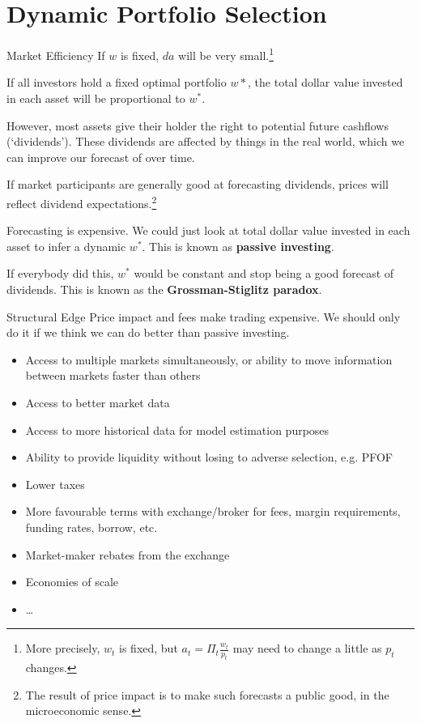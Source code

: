 \documentclass{beamer}
\newcommand{\sectionquote}[1]{\def\insertsquote{#1}}
\newcommand{\insertsquote}{}
\renewcommand{\insertsquote}{}
\begin{document}
\sectionquote{``Values which do not `yet' exist, except as probabilistic estimations, or risk structures, acquire a power of command over economic (and therefore social) processes, necessarily devalorizing the actual.'' Nick Land, Teleoplexy}
\section{Dynamic Portfolio Selection}
\begin{frame}{Market Efficiency}
	If $w$ is fixed, $da$ will be very small.\footnote{More precisely, $w_t$ is fixed, but $a_t=\Pi_t \frac{w_t}{p_t}$ may need to change a little as $p_t$ changes.}

	If all investors hold a fixed optimal portfolio $w*$, the total dollar value invested in each asset will be proportional to $w^*$.

	However, most assets give their holder the right to potential future cashflows (`dividends'). 
	These dividends are affected by things in the real world, which we can improve our forecast of over time.

	If market participants are generally good at forecasting dividends, prices will reflect dividend expectations.\footnote{The result of price impact is to make such forecasts a public good, in the microeconomic sense.}

	Forecasting is expensive. We could just look at total dollar value invested in each asset to infer a dynamic $w^*$. This is known as \textbf{passive investing}.

	If everybody did this, $w^*$ would be constant and stop being a good forecast of dividends. This is known as the \textbf{Grossman-Stiglitz paradox}.
\end{frame}

\begin{frame}{Structural Edge}
	Price impact and fees make trading expensive. We should only do it if we think we can do better than passive investing.

	\begin{itemize}
		\item Access to multiple markets simultaneously, or ability to move information between markets faster than others%
		\item Access to better market data
		\item Access to more historical data for model estimation purposes
		\item Ability to provide liquidity without losing to adverse selection, e.g. PFOF
		\item Lower taxes
		\item More favourable terms with exchange/broker for fees, margin requirements, funding rates, borrow, etc.
		\item Market-maker rebates from the exchange
		\item Economies of scale
		\item \ldots
	\end{itemize}
\end{frame}
\end{document}
